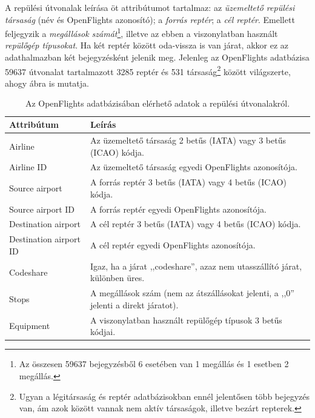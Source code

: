     A repülési útvonalak leírása öt attribútumot tartalmaz: az \emph{üzemeltető repülési társaság} (név és OpenFlights azonosító); a \emph{forrás reptér}; a \emph{cél reptér}. Emellett feljegyzik a \emph{megállások számát}\footnote{Az összesen 59637 bejegyzésből 6 esetében van 1 megállás és 1 esetben 2 megállás.}, illetve az ebben a viszonylatban használt \emph{repülőgép típusokat}. Ha két reptér között oda-vissza is van járat, akkor ez az adathalmazban két bejegyzésként jelenik meg. Jelenleg az OpenFlights adatbázisa 59637 útvonalat tartalmazott 3285 reptér és 531 társaság\footnote{Ugyan a légitársaság és reptér adatbázisokban ennél jelentősen több bejegyzés van, ám azok között vannak nem aktív társaságok, illetve bezárt repterek.} között világszerte, ahogy  ábra is mutatja.

    \begin{table}[ht]
      \footnotesize
      \centering
      \caption{Az OpenFlights adatbázisában elérhető adatok a repülési útvonalakról.}
      \begin{tabular}{ | l | l |}
      \hline
      Attribútum & Leírás \\ \hline
      Airline & Az üzemeltető társaság 2 betűs (IATA) vagy 3 betűs (ICAO) kódja.\\
      Airline ID & Az üzemeltető társaság egyedi OpenFlights azonosítója.\\
      Source airport & A forrás reptér 3 betűs (IATA) vagy 4 betűs (ICAO) kódja.\\
      Source airport ID & A forrás reptér egyedi OpenFlights azonosítója.\\
      Destination airport & A cél reptér 3 betűs (IATA) vagy 4 betűs (ICAO) kódja.\\
      Destination airport ID & A cél reptér egyedi OpenFlights azonosítója.\\
      Codeshare & Igaz, ha a járat ,,codeshare'', azaz nem utasszállító járat, különben üres.\\
      Stops & A megállások szám (nem az átszállásokat jelenti, a ,,0'' jelenti a direkt járatot).\\
      Equipment & A viszonylatban használt repülőgép típusok 3 betűs kódjai.\\
      \hline
      \end{tabular}
      \label{tab:table_repulesiutvonalak}
    \end{table}\newpage


